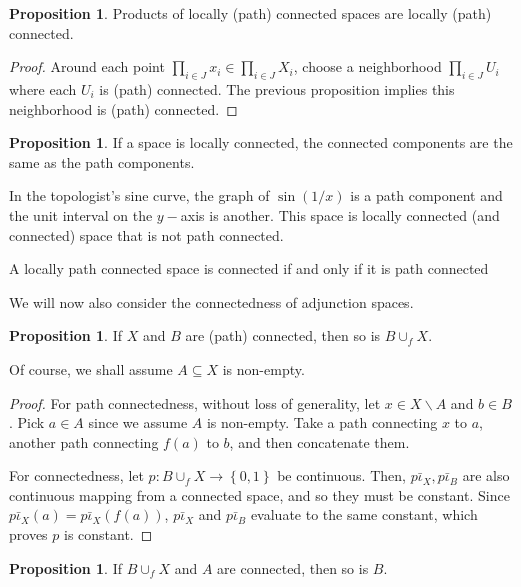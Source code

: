 \documentclass[12pt,reqno]{amsart}
\numberwithin{theorem}{section}
\theoremstyle{definition}
\theoremstyle{remark}
\numberwithin{equation}{section}
\newcommand{\set}[1]{\left \{ #1 \right \}}
\theoremstyle{definition}
\newtheorem{prop}[theorem]{Proposition}
\begin{document}
\begin{prop}
    Products of locally (path) connected spaces are locally (path) connected.
\end{prop}
\begin{proof}
    Around each point $\prod_{i \in J} x_i \in \prod_{i \in J}X_i$, choose a neighborhood $\prod_{i \in J} U_i$ where each $U_i$ is (path) connected. The previous proposition implies this neighborhood is (path) connected.
\end{proof}
\begin{prop}
    If a space is locally connected, the connected components are the same as the path components.
\end{prop}
\begin{example}
    In the topologist's sine curve, the graph of $\sin(1/x)$ is a path component and the unit interval on the $y-$axis is another. This space is locally connected (and connected) space that is not path connected.
\end{example}
\begin{corollary}
    A locally path connected space is connected if and only if it is path connected
\end{corollary}
We will now also consider the connectedness of adjunction spaces.
\begin{prop}
    If $X$ and $B$ are (path) connected, then so is $B\cup_f X$.
\end{prop}
Of course, we shall assume $A\subseteq X$ is non-empty. 
\begin{proof}
For path connectedness, without loss of generality, let $x \in X \backslash A$ and $b \in B$. Pick $a \in A$ since we assume $A$ is non-empty. Take a path connecting $x$ to $a$, another path connecting $f(a)$ to $b$, and then concatenate them.

For connectedness, let $p: B\cup_fX\rightarrow \set {0,1}$ be continuous. Then, $p\bar \iota_X, p\bar \iota_B$ are also continuous mapping from a connected space, and so they must be constant. Since $p\bar \iota_X(a) = p\bar \iota_X(f(a))$, $p\bar \iota_X$ and $p\bar \iota_B$ evaluate to the same constant, which proves $p$ is constant.
\end{proof}
\begin{prop}
    If $B\cup_f X$ and $A$ are connected, then so is $B$.
\end{prop}
\end{document}
